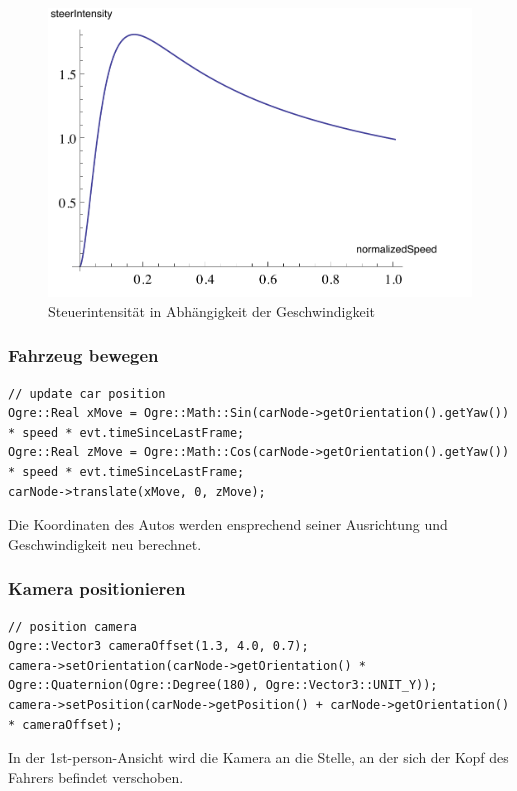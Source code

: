 \begin{figure}[H]
\centering 
\includegraphics[width=0.7\linewidth]{src/steerIntensity.pdf}
\caption{Steuerintensität in Abhängigkeit der Geschwindigkeit} %
\label{steer_intensity} %
\end{figure}

\subsubsection*{Fahrzeug bewegen}
\begin{lstlisting}[caption={Fahrzeug bewegen},label={fahrzeug_bewegen}]
// update car position
Ogre::Real xMove = Ogre::Math::Sin(carNode->getOrientation().getYaw()) * speed * evt.timeSinceLastFrame;
Ogre::Real zMove = Ogre::Math::Cos(carNode->getOrientation().getYaw()) * speed * evt.timeSinceLastFrame;
carNode->translate(xMove, 0, zMove);
\end{lstlisting}

Die Koordinaten des Autos werden ensprechend seiner Ausrichtung und Geschwindigkeit neu berechnet.

\subsubsection*{Kamera positionieren}
\begin{lstlisting}[caption={Positionierung der 1st-Person-Kamera},label={positionierung_fp_kamera}]
// position camera
Ogre::Vector3 cameraOffset(1.3, 4.0, 0.7);
camera->setOrientation(carNode->getOrientation() * Ogre::Quaternion(Ogre::Degree(180), Ogre::Vector3::UNIT_Y));
camera->setPosition(carNode->getPosition() + carNode->getOrientation() * cameraOffset);
\end{lstlisting}
In der \gls{1st-person}-Ansicht wird die Kamera an die Stelle, an der sich der Kopf des Fahrers befindet verschoben.\\

